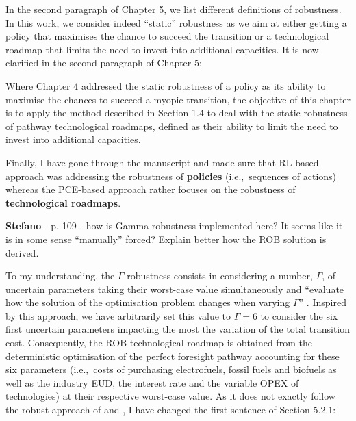 \documentclass[12pt,a4paper]{article}
\def\ie{i.e.,\ }
\begin{document}
In the second paragraph of Chapter 5, we list different definitions of robustness. In this work, we consider indeed ``static'' robustness as we aim at either getting a policy that maximises the chance to succeed the transition or a technological roadmap that limits the need to invest into additional capacities. It is now clarified {\color{blue}in the second paragraph of Chapter 5}:

\begin{mdframed}[style=manuscript] %
Where Chapter 4 addressed the static robustness of a policy as its ability to maximise the chances to succeed a myopic transition, the objective of this chapter is to apply the method described in Section 1.4 to deal with the static robustness of pathway technological roadmaps, defined as their ability to limit the need to invest into additional capacities.
\end{mdframed}

Finally, I have gone through the manuscript and made sure that RL-based approach was addressing the robustness of \textbf{policies} (\ie sequences of actions) whereas the PCE-based approach rather focuses on the robustness of \textbf{technological roadmaps}. 


\begin{mdframed}[style=comment] %
{\color{orange} \textbf{Stefano}} - p. 109 - how is Gamma-robustness implemented here? It seems like it is in some sense ``manually'' forced? Explain better how the ROB solution is derived.
\end{mdframed}

\noindent To my understanding, the $\Gamma$-robustness consists in considering a number, $\Gamma$, of uncertain parameters taking their worst-case value simultaneously and ``evaluate how the solution of the optimisation problem changes when varying $\Gamma$'' \cite{moret2020overcapacity}. Inspired by this approach, we have arbitrarily set this value to $\Gamma=6$ to consider the six first uncertain parameters impacting the most the variation of the total transition cost. Consequently, the ROB technological roadmap is obtained from the deterministic optimisation of the perfect foresight pathway accounting for these six parameters (\ie costs of purchasing electrofuels, fossil fuels and biofuels as well as the industry EUD, the interest rate and the variable OPEX of technologies) at their respective worst-case value. As it does not exactly follow the robust approach of \citet{bertsimas2004price} and \citet{Moret2017PhDThesis}, I have changed {\color{blue}the first sentence of Section 5.2.1}:
\end{document}
